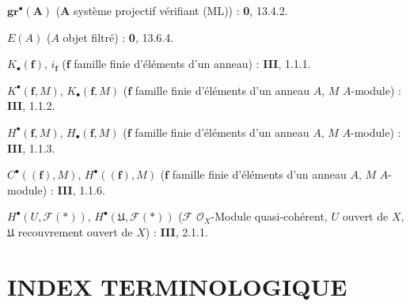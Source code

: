 \begin{flushleft}
$\mathbf{gr}^\bullet(\mathbf A)$ ($\mathbf A$ système projectif vérifiant (ML)) :
\textbf{0}, 13.4.2.

$E(A)$ ($A$ objet filtré) : \textbf{0}, 13.6.4.

$K_\bullet(\mathbf f)$, $i_{\mathbf f}$ ($\mathbf f$ famille finie d'éléments
d'un anneau) : \textbf{III}, 1.1.1.

$K^\bullet(\mathbf f,M)$, $K_\bullet(\mathbf f,M)$ ($\mathbf f$ famille
finie d'éléments d'un anneau $A$, $M$ $A$-module) : \textbf{III}, 1.1.2.

$H^\bullet(\mathbf f,M)$, $H_\bullet(\mathbf f,M)$ ($\mathbf f$ famille
finie d'éléments d'un anneau $A$, $M$ $A$-module) : \textbf{III}, 1.1.3.

$C^\bullet((\mathbf f),M)$, $H^\bullet((\mathbf f),M)$ ($\mathbf f$ famille
finie d'éléments d'un anneau $A$, $M$ $A$-module) : \textbf{III}, 1.1.6.

$H^\bullet(U,\mathcal F(*))$,
$H^\bullet(\mathfrak U,\mathcal F(*))$ ($\mathcal F$
$\mathcal O_X$-Module quasi-cohérent, $U$ ouvert de $X$, $\mathfrak U$
recouvrement ouvert de $X$) : \textbf{III}, 2.1.1.
\end{flushleft}

\clearpage
{}
\section*{INDEX TERMINOLOGIQUE}

